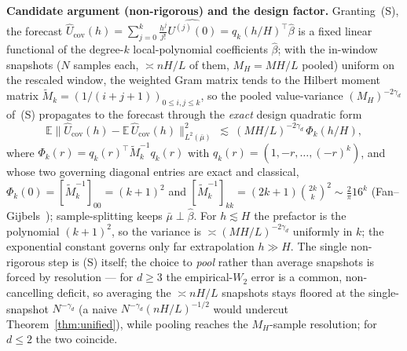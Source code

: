 \documentclass[11pt]{article}
\theoremstyle{definition}
\theoremstyle{remark}
\newcommand{\E}{\mathbb{E}}
\begin{document}
\noindent\textbf{Candidate argument (non-rigorous) and the design factor.} Granting~(S), the
forecast $\widehat U_{\mathrm{cov}}(h)=\sum_{j=0}^k\tfrac{h^j}{j!}\widehat{U^{(j)}(0)}
=q_k(h/H)^\top\widehat\beta$ is a fixed linear functional of the degree-$k$ local-polynomial
coefficients $\widehat\beta$; with the in-window snapshots ($N$ samples each, $\asymp nH/L$ of them,
$M_H=MH/L$ pooled) uniform on the rescaled window, the weighted Gram matrix tends to the Hilbert
moment matrix $\widetilde M_k=(1/(i{+}j{+}1))_{0\le i,j\le k}$, so the pooled value-variance
$(M_H)^{-2\gamma_d}$ of~(S) propagates to the forecast through the \emph{exact} design quadratic form
\[
   \E\big\|\widehat U_{\mathrm{cov}}(h)-\E\,\widehat U_{\mathrm{cov}}(h)\big\|_{L^2(\bar\mu)}^{2}
   \ \lesssim\ (MH/L)^{-2\gamma_d}\,\Phi_k(h/H),
\]
where $\Phi_k(r)=q_k(r)^\top\widetilde M_k^{-1}q_k(r)$ with $q_k(r)=(1,-r,\dots,(-r)^k)$, and whose two
governing diagonal entries are exact and classical,
$\Phi_k(0)=[\widetilde M_k^{-1}]_{00}=(k+1)^2$ and
$[\widetilde M_k^{-1}]_{kk}=(2k+1)\binom{2k}{k}^2\sim\tfrac{2}{\pi}16^k$
(Fan--Gijbels~\cite{fangijbels}); sample-splitting keeps $\bar\mu\perp\widehat\beta$. For $h\lesssim H$
the prefactor is the polynomial $(k+1)^2$, so the variance is $\asymp(MH/L)^{-2\gamma_d}$ uniformly in
$k$; the exponential constant governs only far extrapolation $h\gg H$. The single non-rigorous step is
(S) itself; the choice to \emph{pool} rather than average snapshots is forced by resolution --- for
$d\ge3$ the empirical-$W_2$ error is a common, non-cancelling deficit, so averaging the $\asymp nH/L$
snapshots stays floored at the single-snapshot $N^{-\gamma_d}$ (a naive $N^{-\gamma_d}(nH/L)^{-1/2}$
would undercut Theorem~\ref{thm:unified}), while pooling reaches the $M_H$-sample resolution; for
$d\le2$ the two coincide.
\end{document}
